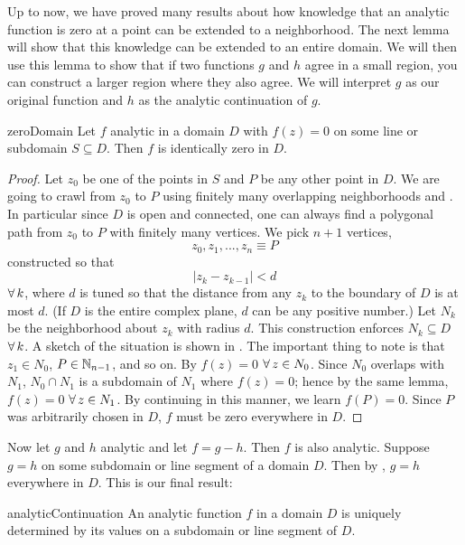 Up to now, we have proved many results about how knowledge that
an analytic function is zero at a point can be extended to a neighborhood. The
next lemma will show that this knowledge can be extended to an entire domain. We
will then use this lemma to show that if two functions $g$ and $h$ agree in a 
small region, you can construct a larger region where they also agree. We will
interpret $g$ as our original function and $h$ as the analytic 
continuation of $g$.

\begin{lemma}{}{zeroDomain}
Let $f$ analytic in a domain $D$ with $f(z)=0$ on some line or subdomain
$S\subseteq D$. Then $f$ is identically zero in $D$.
\begin{proof}
Let $z_0$ be one of the points in $S$ and $P$ be any other point in $D$. We are
going to crawl from $z_0$ to $P$ using finitely many overlapping neighborhoods
and .
In particular since $D$ is open and connected, one can always find a polygonal path
from $z_0$ to $P$ with finitely many vertices. We pick $n+1$ vertices, 
$$
z_0,z_1,...,z_n\equiv P
$$
constructed so that
$$
|z_k-z_{k-1}|<d
$$
$\operatorname{\forall} k$, where $d$ is tuned so that the distance from any $z_k$ to the boundary
of $D$ is at most $d$. (If $D$ is the entire complex plane, $d$ can be any
positive number.) Let $N_k$ be the neighborhood about $z_k$ with radius $d$.
This construction enforces $N_k\subseteq D$ $\operatorname{\forall} k$.
A sketch of the situation is shown in . The important thing
to note is that $z_1\in N_0$, $P\in\mathbb{N}_{n-1}$, and so on.
By  $f(z)=0$ $\operatorname{\forall} z\in N_0$. Since $N_0$ overlaps with
$N_1$, $N_0\cap N_1$ is a subdomain of $N_1$ where $f(z)=0$; hence by the same
lemma, $f(z)=0$ $\operatorname{\forall} z\in N_1$. By continuing in this manner, we learn
$f(P)=0$. Since $P$ was arbitrarily chosen in $D$, $f$ must be zero everywhere
in $D$.
\end{proof}
\end{lemma}

Now let $g$ and $h$ analytic and let $f=g-h$. Then $f$ is also analytic. Suppose
$g=h$ on some subdomain or line segment of a domain $D$. Then by
, $g=h$ everywhere in $D$. This is our final result:

\begin{theorem}{}{analyticContinuation}
An analytic function $f$ in a domain $D$ is uniquely determined by its values on
a subdomain or line segment of $D$.
\end{theorem}

